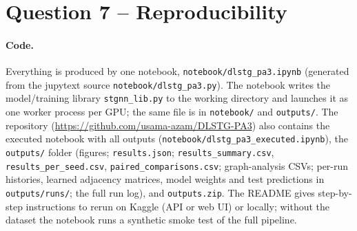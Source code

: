 \documentclass[11pt,a4paper]{article}
\newcommand{\repourl}{https://github.com/usama-azam/DLSTG-PA3}
\begin{document}
\section{Question 7 -- Reproducibility}
\paragraph{Code.} Everything is produced by one notebook, \texttt{notebook/dlstg\_pa3.ipynb} (generated from the jupytext source
\texttt{notebook/dlstg\_pa3.py}). The notebook writes the model/training library \texttt{stgnn\_lib.py} to the working directory
and launches it as one worker process per GPU; the same file is in \texttt{notebook/} and \texttt{outputs/}. The repository
(\url{\repourl}) also contains the executed notebook with all outputs (\texttt{notebook/dlstg\_pa3\_executed.ipynb}), the
\texttt{outputs/} folder (figures; \texttt{results.json}; \texttt{results\_summary.csv}, \texttt{results\_per\_seed.csv},
\texttt{paired\_comparisons.csv}; graph-analysis CSVs; per-run histories, learned adjacency matrices, model weights and test
predictions in \texttt{outputs/runs/}; the full run log), and \texttt{outputs.zip}. The README gives step-by-step instructions to
rerun on Kaggle (API or web UI) or locally; without the dataset the notebook runs a synthetic smoke test of the full pipeline.
\end{document}
